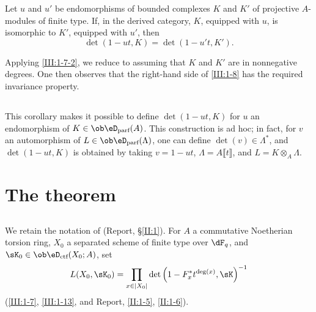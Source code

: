 \begin{corollary_}\label{III:1-13}
Let $u$ and $u'$ be endomorphisms of bounded complexes $K$ and $K'$ of
projective $A$-modules of finite type. If, in the derived category, $K$,
equipped with $u$, is isomorphic to $K'$, equipped with $u'$, then
\[
  \det(1-u t,K) = \det(1-u' t,K') \text{.}
\]
\end{corollary_}

Applying \ref{III:1-7-2}, we reduce to assuming that $K$ and $K'$ are in
nonnegative degrees. One then observes that the right-hand side of
\ref{III:1-8} has the required invariance property.






\subsection{}\label{III:1-14}

This corollary makes it possible to define $\det(1-u t,K)$ for $u$ an
endomorphism of $K\in \ob\eD_\text{parf}(A)$. This construction is ad hoc; in
fact, for $v$ an automorphism of $L\in\ob\eD_\text{parf}(\Lambda)$, one can
define $\det(v)\in\Lambda^*$, and $\det(1-u t,K)$ is obtained by taking
$v=1-u t$, $\Lambda=A\llbracket t\rrbracket$, and
$L=K\otimes_A\Lambda$.









\section{The theorem}\label{III:2}






\subsection{}\label{III:2-1}

We retain the notation of (Report, \S\ref{II:1}). For $A$ a commutative
Noetherian torsion ring, $X_0$ a separated scheme of finite type over
$\dF_q$, and $\sK_0\in\ob\eD_\text{ctf}(X_0;A)$, set
\[
  L(X_0,\sK_0) = \prod_{x\in |X_0|} \det\left(1-F_x^* t^{\deg(x)}, \sK\right)^{-1}
\]
(\ref{III:1-7}, \ref{III:1-13}, and Report, \ref{II:1-5}, \ref{II:1-6}).





